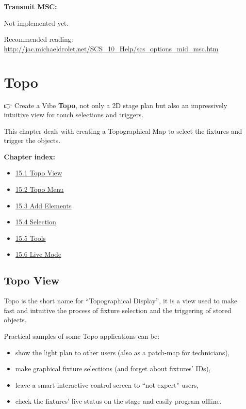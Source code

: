 \documentclass[
]{article}
\providecommand{\tightlist}{%
  \setlength{\itemsep}{0pt}\setlength{\parskip}{0pt}}
\begin{document}
\textbf{Transmit MSC:}

{Not implemented yet.}

Recommended reading: \url{http://jac.michaeldrolet.net/SCS_10_Help/scs_options_mid_msc.htm}

\hypertarget{topo}{%
\section{Topo}\label{topo}}

👉 Create a Vibe \textbf{Topo}, not only a 2D stage plan but also an impressively intuitive view for touch selections and triggers.

This chapter deals with creating a Topographical Map to select the fixtures and trigger the objects.

\textbf{Chapter index:}

\begin{itemize}
\tightlist
\item
  \protect\hyperlink{Topo-View-15.1}{15.1 Topo View}
\item
  \protect\hyperlink{Topo-Menu-15.2}{15.2 Topo Menu}
\item
  \protect\hyperlink{Add-Elements-15.3}{15.3 Add Elements}
\item
  \protect\hyperlink{Selection-15.4}{15.4 Selection}
\item
  \protect\hyperlink{Tools-15.5}{15.5 Tools}
\item
  \protect\hyperlink{Live-Mode-15.6}{15.6 Live Mode}
\end{itemize}

\hypertarget{Topo-View-15.1}{%
\subsection{Topo View}\label{Topo-View-15.1}}

Topo is the short name for ``Topographical Display'', it is a view used to make fast and intuitive the process of fixture selection and the triggering of stored objects.

Practical samples of some Topo applications can be:

\begin{itemize}
\item
  show the light plan to other users (also as a patch-map for technicians),
\item
  make graphical fixture selections (and forget about fixtures' IDs),
\item
  leave a smart interactive control screen to ``not-expert'' users,
\item
  check the fixtures' live status on the stage and easily program offline.
\end{itemize}
\end{document}
